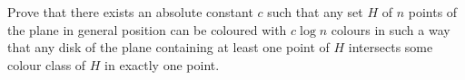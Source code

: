 Prove that there exists an absolute constant $c$ such that any set $H$ of $n$ points of the plane in general position can be coloured with $c\log n$ colours in such a way that any disk of the plane containing at least one point of $H$ intersects some colour class of $H$ in exactly one point.